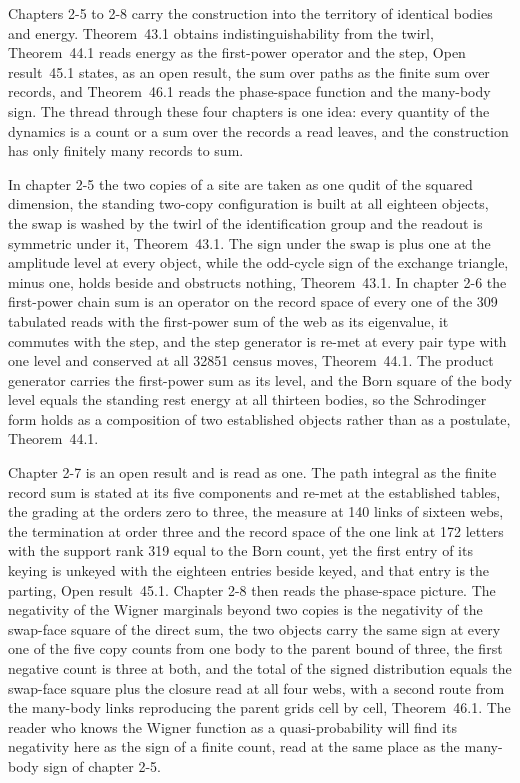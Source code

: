 Chapters 2-5 to 2-8 carry the construction into the territory of identical bodies and energy. Theorem~43.1 obtains indistinguishability from the twirl, Theorem~44.1 reads energy as the first-power operator and the step, Open result~45.1 states, as an open result, the sum over paths as the finite sum over records, and Theorem~46.1 reads the phase-space function and the many-body sign. The thread through these four chapters is one idea: every quantity of the dynamics is a count or a sum over the records a read leaves, and the construction has only finitely many records to sum.

In chapter 2-5 the two copies of a site are taken as one qudit of the squared dimension, the standing two-copy configuration is built at all eighteen objects, the swap is washed by the twirl of the identification group and the readout is symmetric under it, Theorem~43.1. The sign under the swap is plus one at the amplitude level at every object, while the odd-cycle sign of the exchange triangle, minus one, holds beside and obstructs nothing, Theorem~43.1. In chapter 2-6 the first-power chain sum is an operator on the record space of every one of the 309 tabulated reads with the first-power sum of the web as its eigenvalue, it commutes with the step, and the step generator is re-met at every pair type with one level and conserved at all 32851 census moves, Theorem~44.1. The product generator carries the first-power sum as its level, and the Born square of the body level equals the standing rest energy at all thirteen bodies, so the Schrodinger form holds as a composition of two established objects rather than as a postulate, Theorem~44.1.

Chapter 2-7 is an open result and is read as one. The path integral as the finite record sum is stated at its five components and re-met at the established tables, the grading at the orders zero to three, the measure at 140 links of sixteen webs, the termination at order three and the record space of the one link at 172 letters with the support rank 319 equal to the Born count, yet the first entry of its keying is unkeyed with the eighteen entries beside keyed, and that entry is the parting, Open result~45.1. Chapter 2-8 then reads the phase-space picture. The negativity of the Wigner marginals beyond two copies is the negativity of the swap-face square of the direct sum, the two objects carry the same sign at every one of the five copy counts from one body to the parent bound of three, the first negative count is three at both, and the total of the signed distribution equals the swap-face square plus the closure read at all four webs, with a second route from the many-body links reproducing the parent grids cell by cell, Theorem~46.1. The reader who knows the Wigner function as a quasi-probability will find its negativity here as the sign of a finite count, read at the same place as the many-body sign of chapter 2-5.


